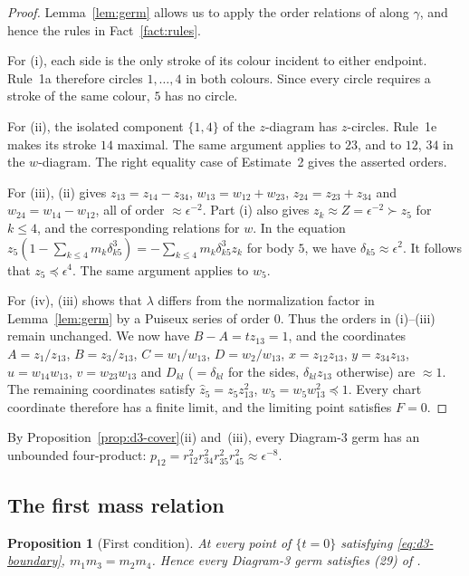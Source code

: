 \documentclass[11pt]{amsart}
\newtheorem{proposition}[theorem]{Proposition}
\theoremstyle{definition}
\theoremstyle{remark}
\begin{document}
\begin{proof}
{Lemma~\ref{lem:germ} allows us to apply the order relations of \cite[\S3]{AK}
along $\gamma$, and hence the rules in Fact~\ref{fact:rules}.

For (i), each side is the only stroke of its colour incident to either endpoint.
Rule~1a \cite[pp.~545--546]{AK} therefore circles $1,\dots,4$ in both colours.
Since every circle requires a stroke of the same colour, $5$ has no circle.

For (ii), the isolated component $\{1,4\}$ of the $z$-diagram has $z$-circles.
Rule~1e \cite[p.~546]{AK} makes its stroke $14$ maximal. The same argument applies to $23$,
and to $12$, $34$ in the $w$-diagram. The right equality case of Estimate~2
\cite[p.~548]{AK} gives the asserted orders.

For (iii), (ii) gives $z_{13}=z_{14}-z_{34}$, $w_{13}=w_{12}+w_{23}$, $z_{24}=z_{23}+z_{34}$ and
$w_{24}=w_{14}-w_{12}$, all of order $\approx\epsilon^{-2}$.
Part (i) also gives $z_k\approx Z=\epsilon^{-2}\succ z_5$ for $k\le4$, and the corresponding
relations for $w$. In the equation
$z_5(1-\sum_{k\le4}m_k\delta_{k5}^3)=-\sum_{k\le4}m_k\delta_{k5}^3z_k$ for body $5$,
we have $\delta_{k5}\approx\epsilon^2$. It follows that $z_5\preccurlyeq\epsilon^4$.
The same argument applies to $w_5$.

For (iv), (iii) shows that $\lambda$ differs from the normalization factor in
Lemma~\ref{lem:germ} by a Puiseux series of order $0$. Thus the orders in (i)--(iii) remain
unchanged. We now have $B-A=tz_{13}=1$, and the coordinates $A=z_1/z_{13}$, $B=z_3/z_{13}$,
$C=w_1/w_{13}$, $D=w_2/w_{13}$, $x=z_{12}z_{13}$, $y=z_{34}z_{13}$, $u=w_{14}w_{13}$,
$v=w_{23}w_{13}$ and $D_{kl}$ ($=\delta_{kl}$ for the sides, $\delta_{kl}z_{13}$ otherwise) are
$\approx1$. The remaining coordinates satisfy $\hat z_5=z_5z_{13}^2$,
$\hat w_5=w_5w_{13}^2\preccurlyeq1$. Every chart coordinate therefore has a finite limit,
and the limiting point satisfies $F=0$.}
\end{proof}

By Proposition~\ref{prop:d3-cover}(ii) and~(iii), every Diagram-3 germ has an unbounded
four-product: $p_{12}=r_{12}^2r_{34}^2r_{35}^2r_{45}^2\approx\epsilon^{-8}$.

\subsection{The first mass relation}

\begin{proposition}[First condition]\label{prop:d3-first}
At every point of $\{t=0\}$ satisfying \eqref{eq:d3-boundary}, $m_1m_3=m_2m_4$.  Hence every
Diagram-3 germ satisfies (29) of \cite[\S8.3]{AK}.
\end{proposition}
\end{document}
